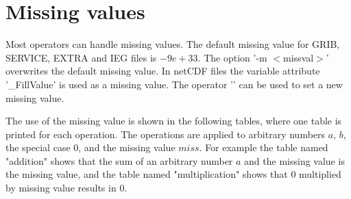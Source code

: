 \section{Missing values}

Most operators can handle missing values.
The default missing value for GRIB, SERVICE, EXTRA and IEG files is $-9e+33$. 
The {\CDO} option '-m $<$missval$>$' overwrites the default missing value.
In netCDF files the variable attribute '\_FillValue' is used as a missing value.
The operator '' can be used to set a new missing value.

The {\CDO} use of the missing value is shown in the following tables,
where one table is printed for each operation.
The operations are applied to arbitrary numbers $a$, $b$, the special case $0$,
and the missing value $miss$.
For example the table named "addition" shows that the sum of an
arbitrary number $a$ and the missing value is the missing value,
and the table named "multiplication" shows that $0$ multiplied by missing
value results in $0$.

